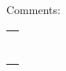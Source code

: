 \documentclass{article}
\begin{document}
\vspace{0in plus 1fill}

Comments: \\
\begin{tabular}{c}
  \hspace{6.25in} \\
  \mbox{} \\ \cline{1-1} \mbox{} \\
  \mbox{} \\ \cline{1-1} \mbox{} \\
  \mbox{} \\ \cline{1-1} \mbox{} \\
\end{tabular}

\newpage





\begin{small}

\end{small}
\end{document}
